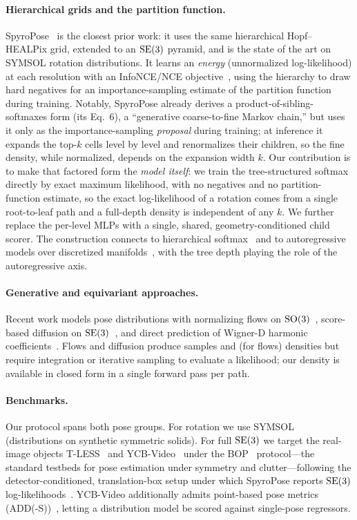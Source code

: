 \paragraph{Hierarchical grids and the partition function.}
SpyroPose~\cite{haugaard2023spyropose} is the closest prior work: it uses the
same hierarchical Hopf--HEALPix grid, extended to an $\mathrm{SE}(3)$ pyramid, and is
the state of the art on SYMSOL rotation distributions. It learns an
\emph{energy} (unnormalized log-likelihood) at each resolution with an
InfoNCE/NCE objective~\cite{oord2018cpc}, using the hierarchy to draw hard negatives for
an importance-sampling estimate of the partition function during training.
Notably, SpyroPose already derives a product-of-sibling-softmaxes form
(its Eq.~6), a ``generative coarse-to-fine Markov chain,'' but uses it only as
the importance-sampling \emph{proposal} during training; at inference it expands
the top-$k$ cells level by level and renormalizes their children, so the fine
density, while normalized, depends on the expansion width $k$.
Our contribution is to make that factored form the \emph{model itself}: we train
the tree-structured softmax directly by exact maximum likelihood, with no
negatives and no partition-function estimate, so the exact log-likelihood of a
rotation comes from a single root-to-leaf path and a full-depth density is
independent of any $k$. We further replace the per-level MLPs with a single,
shared, geometry-conditioned child scorer. The construction connects to
hierarchical softmax~\cite{morin2005hierarchical} and to autoregressive models over discretized
manifolds~\cite{alcorn2023aquamam}, with the tree depth playing the role of the
autoregressive axis.

\paragraph{Generative and equivariant approaches.}
Recent work models pose distributions with normalizing flows on
$\mathrm{SO}(3)$~\cite{liu2023so3flow}, score-based diffusion on
$\mathrm{SE}(3)$~\cite{hsiao2023confronting}, and direct prediction of Wigner-D
harmonic coefficients~\cite{lee2024wignerd}. Flows and diffusion produce
samples and (for flows) densities but require integration or iterative sampling
to evaluate a likelihood; our density is available in closed form in a single
forward pass per path.

\paragraph{Benchmarks.}
Our protocol spans both pose groups. For rotation we use
SYMSOL~\cite{murphy2021ipdf} (distributions on synthetic symmetric solids). For
full $\mathrm{SE}(3)$ we target the real-image objects T-LESS~\cite{hodan2017tless} and
YCB-Video~\cite{xiang2018posecnn} under the BOP~\cite{nguyen2024bop} protocol---the
standard testbeds for pose estimation under symmetry and clutter---following the
detector-conditioned, translation-box setup under which SpyroPose reports
$\mathrm{SE}(3)$ log-likelihoods~\cite{haugaard2023spyropose}. YCB-Video additionally
admits point-based pose metrics (ADD(-S))~\cite{xiang2018posecnn}, letting a
distribution model be scored against single-pose regressors.
